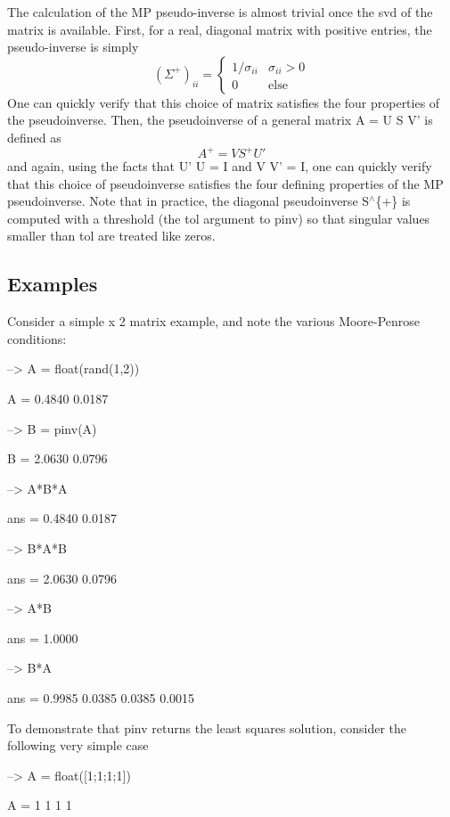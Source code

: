 The calculation of the M\-P pseudo-\/inverse is almost trivial once the svd of the matrix is available. First, for a real, diagonal matrix with positive entries, the pseudo-\/inverse is simply \[ \left(\Sigma^{+}\right)_{ii} = \begin{cases} 1/\sigma_{ii} & \sigma_{ii} > 0 \\ 0 & \mathrm{else} \end{cases} \] One can quickly verify that this choice of matrix satisfies the four properties of the pseudoinverse. Then, the pseudoinverse of a general matrix {\ttfamily A = U S V'} is defined as \[ A^{+} = V S^{+} U' \] and again, using the facts that {\ttfamily U' U = I} and {\ttfamily V V' = I}, one can quickly verify that this choice of pseudoinverse satisfies the four defining properties of the M\-P pseudoinverse. Note that in practice, the diagonal pseudoinverse {\ttfamily S$^\wedge$\{+\}} is computed with a threshold (the {\ttfamily tol} argument to {\ttfamily pinv}) so that singular values smaller than {\ttfamily tol} are treated like zeros. \hypertarget{variables_matrix_Examples}{}\subsection{Examples}\label{variables_matrix_Examples}
Consider a simple { x 2} matrix example, and note the various Moore-\/\-Penrose conditions\-:


\begin{DoxyVerbInclude}
--> A = float(rand(1,2))

A = 
    0.4840    0.0187 

--> B = pinv(A)

B = 
    2.0630 
    0.0796 

--> A*B*A

ans = 
    0.4840    0.0187 

--> B*A*B

ans = 
    2.0630 
    0.0796 

--> A*B

ans = 
    1.0000 

--> B*A

ans = 
    0.9985    0.0385 
    0.0385    0.0015 
\end{DoxyVerbInclude}


To demonstrate that {\ttfamily pinv} returns the least squares solution, consider the following very simple case


\begin{DoxyVerbInclude}
--> A = float([1;1;1;1])

A = 
 1 
 1 
 1 
 1 
\end{DoxyVerbInclude}


